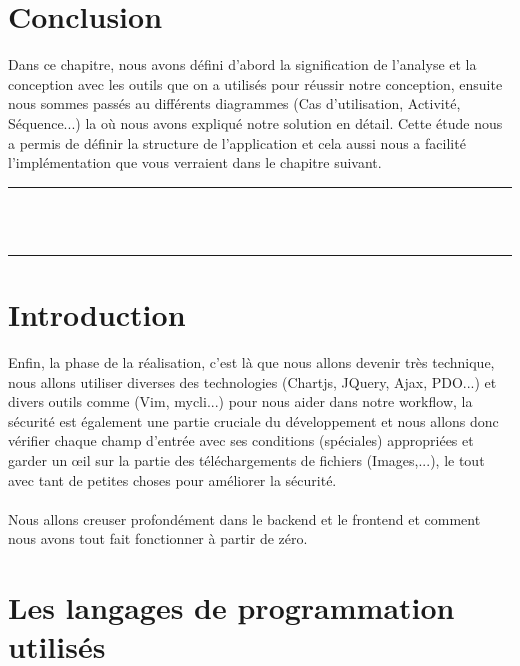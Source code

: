 \documentclass[12pt]{report}
\begin{document}
\section{Conclusion}
Dans ce chapitre, nous avons défini d'abord la signification de l'analyse et la conception avec les outils que on a utilisés pour réussir notre conception, ensuite nous sommes passés au différents diagrammes (Cas d'utilisation, Activité, Séquence...) la où nous avons expliqué notre solution en détail. Cette étude nous a permis de définir la structure de l’application et cela aussi nous a facilité l’implémentation que vous verraient dans le chapitre suivant.

\newpage

\vspace*{\fill}
\begin{center}
    {\color{Blue} \rule{\linewidth}{1.2mm} }\\
\vspace{0.25in}
    {\centering{}}
\vspace{0.35in}\\
    {\color{Blue} \rule{\linewidth}{1.2mm} }
\end{center}
\vspace*{\fill}
\setcounter{section}{0}

\newpage

\section{Introduction}

Enfin, la phase de la réalisation, c'est là que nous allons devenir très technique, nous allons utiliser diverses des technologies (Chartjs, JQuery, Ajax, PDO...) et divers outils comme (Vim, mycli...) pour nous aider dans notre workflow, la sécurité est également une partie cruciale du développement et nous allons donc vérifier chaque champ d'entrée avec ses conditions (spéciales) appropriées et garder un œil sur la partie des téléchargements de fichiers (Images,...), le tout avec tant de petites choses pour améliorer la sécurité.
\\\\
Nous allons creuser profondément dans le backend et le frontend et comment nous avons tout fait fonctionner à partir de zéro.

\section{Les langages de programmation utilisés}
\end{document}
